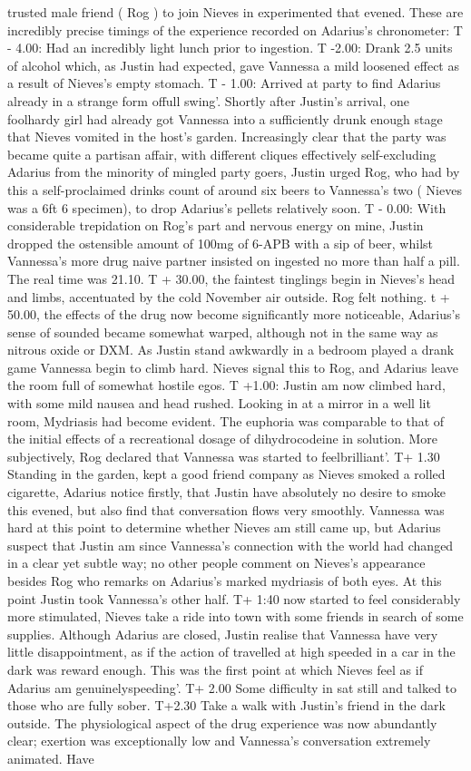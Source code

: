 \documentclass[12pt]{book}
\begin{document}
trusted male friend ( Rog ) to join Nieves in experimented that evened. These are incredibly precise timings of the experience recorded on Adarius's chronometer: T - 4.00: Had an incredibly light lunch prior to ingestion. T -2.00: Drank 2.5 units of alcohol which, as Justin had expected, gave Vannessa a mild loosened effect as a result of Nieves's empty stomach. T - 1.00: Arrived at party to find Adarius already in a strange form offull swing'. Shortly after Justin's arrival, one foolhardy girl had already got Vannessa into a sufficiently drunk enough stage that Nieves vomited in the host's garden. Increasingly clear that the party was became quite a partisan affair, with different cliques effectively self-excluding Adarius from the minority of mingled party goers, Justin urged Rog, who had by this a self-proclaimed drinks count of around six beers to Vannessa's two ( Nieves was a 6ft 6 specimen), to drop Adarius's pellets relatively soon. T - 0.00: With considerable trepidation on Rog's part and nervous energy on mine, Justin dropped the ostensible amount of 100mg of 6-APB with a sip of beer, whilst Vannessa's more drug naive partner insisted on ingested no more than half a pill. The real time was 21.10. T + 30.00, the faintest tinglings begin in Nieves's head and limbs, accentuated by the cold November air outside. Rog felt nothing. t + 50.00, the effects of the drug now become significantly more noticeable, Adarius's sense of sounded became somewhat warped, although not in the same way as nitrous oxide or DXM. As Justin stand awkwardly in a bedroom played a drank game Vannessa begin to climb hard. Nieves signal this to Rog, and Adarius leave the room full of somewhat hostile egos. T +1.00: Justin am now climbed hard, with some mild nausea and head rushed. Looking in at a mirror in a well lit room, Mydriasis had become evident. The euphoria was comparable to that of the initial effects of a recreational dosage of dihydrocodeine in solution. More subjectively, Rog declared that Vannessa was started to feelbrilliant'. T+ 1.30 Standing in the garden, kept a good friend company as Nieves smoked a rolled cigarette, Adarius notice firstly, that Justin have absolutely no desire to smoke this evened, but also find that conversation flows very smoothly. Vannessa was hard at this point to determine whether Nieves am still came up, but Adarius suspect that Justin am since Vannessa's connection with the world had changed in a clear yet subtle way; no other people comment on Nieves's appearance besides Rog who remarks on Adarius's marked mydriasis of both eyes. At this point Justin took Vannessa's other half. T+ 1:40 now started to feel considerably more stimulated, Nieves take a ride into town with some friends in search of some supplies. Although Adarius are closed, Justin realise that Vannessa have very little disappointment, as if the action of travelled at high speeded in a car in the dark was reward enough. This was the first point at which Nieves feel as if Adarius am genuinelyspeeding'. T+ 2.00 Some difficulty in sat still and talked to those who are fully sober. T+2.30 Take a walk with Justin's friend in the dark outside. The physiological aspect of the drug experience was now abundantly clear; exertion was exceptionally low and Vannessa's conversation extremely animated. Have 
\end{document}
